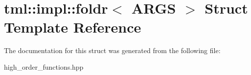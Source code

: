 \hypertarget{structtml_1_1impl_1_1foldr}{\section{tml\+:\+:impl\+:\+:foldr$<$ A\+R\+G\+S $>$ Struct Template Reference}
\label{structtml_1_1impl_1_1foldr}
}


The documentation for this struct was generated from the following file\+:\begin{DoxyCompactItemize}
\item 
high\+\_\+order\+\_\+functions.\+hpp\end{DoxyCompactItemize}
